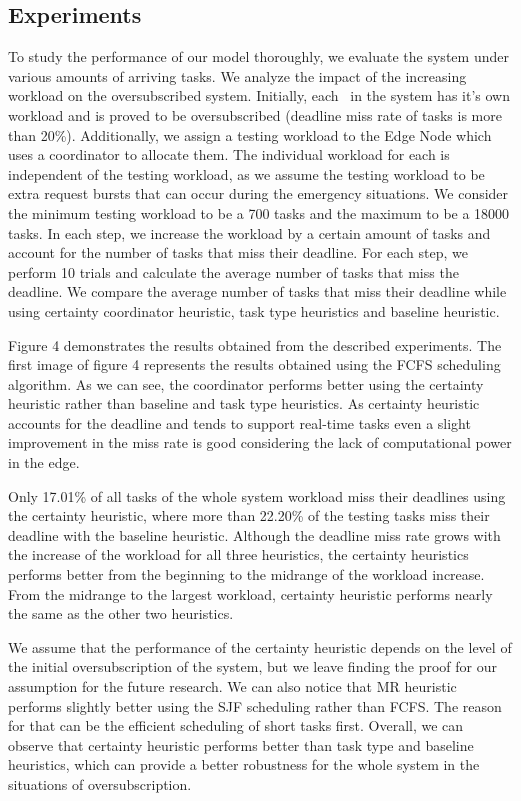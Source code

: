 \subsection{Experiments}
To study the performance of our model thoroughly, we evaluate the system under various amounts of arriving tasks. We analyze the impact of the increasing workload on the oversubscribed system. Initially, each \pu~in the system has it's own workload and is proved to be oversubscribed (deadline miss rate of tasks is more than 20\%). Additionally, we assign a testing workload to the Edge Node which uses a coordinator to allocate them. The individual workload for each \pu is independent of the testing workload, as we assume the testing workload to be extra request bursts that can occur during the emergency situations. We consider the minimum testing workload to be a 700 tasks and the maximum to be a 18000 tasks. In each step, we increase the workload by a certain amount of tasks and account for the number of tasks that miss their deadline. For each step, we perform 10 trials and calculate the average number of tasks that miss the deadline. We compare the average number of tasks that miss their deadline while using certainty coordinator heuristic, task type heuristics and baseline heuristic. 

Figure 4 demonstrates the results obtained from the described experiments. The first image of figure 4 represents the results obtained using the FCFS scheduling algorithm. As we can see, the coordinator performs better using the certainty heuristic rather than baseline and task type heuristics. As certainty heuristic accounts for the deadline and tends to support real-time tasks even a slight improvement in the miss rate is good considering the lack of computational power in the edge. 


Only 17.01\% of all tasks of the whole system workload miss their deadlines using the certainty heuristic, where more than 22.20\% of the testing tasks miss their deadline with the baseline heuristic. Although the deadline miss rate grows with the increase of the workload for all three heuristics, the certainty heuristics performs better from the beginning to the midrange of the workload increase. From the midrange to the largest workload, certainty heuristic performs nearly the same as the other two heuristics.

We assume that the performance of the certainty heuristic depends on the level of the initial oversubscription of the system, but we leave finding the proof for our assumption for the future research. We can also notice that MR heuristic performs slightly better using the SJF scheduling rather than FCFS. The reason for that can be the efficient scheduling of short tasks first. Overall, we can observe that certainty heuristic performs better than task type and baseline heuristics, which can provide a better robustness for the whole system in the situations of oversubscription. 

